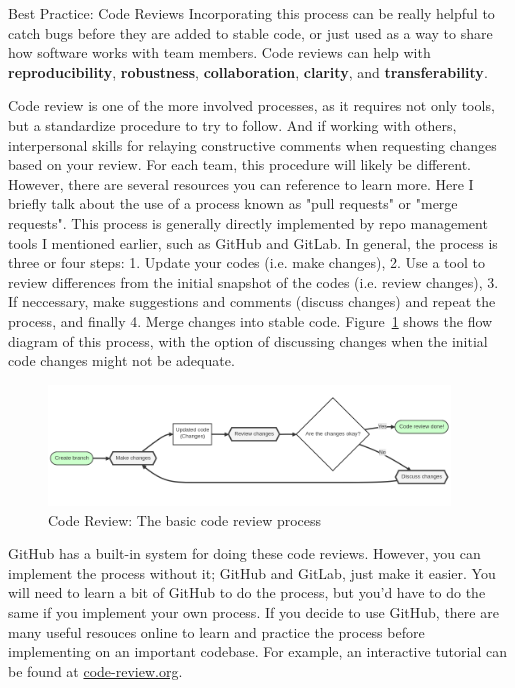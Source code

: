 \documentclass[final]{beamer}
\newlength{\colwidth}
\begin{document}
\begin{frame}[t]
\begin{columns}[t]
\begin{column}{\colwidth}
\begin{block}{Best Practice: Code Reviews}
    Incorporating this process can be really helpful to catch bugs before they
    are added to stable code, or just used as a way to share how software works
    with team members.
    Code reviews can help with \textbf{reproducibility},
    \textbf{robustness},  \textbf{collaboration}, \textbf{clarity}, and 
    \textbf{transferability}.
  
    Code review is one of the more involved processes, as it requires not only
    tools, but a standardize procedure to try to follow.
    And if working with others, interpersonal skills for relaying constructive
    comments when requesting changes based on your review.
    For each team, this procedure will likely be different.
    However, there are several resources you can reference to learn more.
    Here I briefly talk about the use of a process known as "pull requests" or
    "merge requests".
    This process is generally directly implemented by repo management tools I
    mentioned earlier, such as GitHub and GitLab.
    In general, the process is three or four steps:
    1. Update your codes (i.e. make changes),
    2. Use a tool to review differences from the initial snapshot of the codes
    (i.e. review changes),
    3. If neccessary, make suggestions and comments (discuss changes) and
    repeat the process, and finally
    4. Merge changes into stable code.
    Figure~\ref*{fig:code-review} shows the flow diagram of this process, with
    the option of discussing changes when the initial code changes might not be
    adequate.

    \begin{figure}
      \centering
      \vspace{-1em}
      \includegraphics[width=0.95\textwidth]{tess2024/code-review-flow-diagram.png}
      \caption{Code Review: The basic code review process}
      \label{fig:code-review}
    \end{figure}
    
    GitHub has a built-in system for doing these code reviews.
    However, you can implement the process without it; GitHub and GitLab, just
    make it easier.
    You will need to learn a bit of GitHub to do the process, but you'd have to
    do the same if you implement your own process.
    If you decide to use GitHub, there are many useful resouces online to learn
    and practice the process before implementing on an important codebase.
    For example, an interactive tutorial can be found at
    \href{https://code-review.org}{code-review.org}\cite{code-review}.


\end{block}
\end{column}
\end{columns}
\end{frame}
\end{document}
